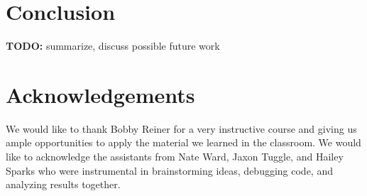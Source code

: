 \documentclass[11pt]{amsart}
\begin{document}
%

%

\section{Conclusion}\label{sec:conclustion}
\textbf{TODO:} summarize, discuss possible future work

\section*{Acknowledgements} 
We would like to thank Bobby Reiner for a very instructive course and giving us ample opportunities to apply the material we learned in the classroom.
We would like to acknowledge the assistants from Nate Ward, Jaxon Tuggle, and Hailey Sparks who were instrumental in brainstorming ideas, debugging code, and analyzing results together.
\end{document}
